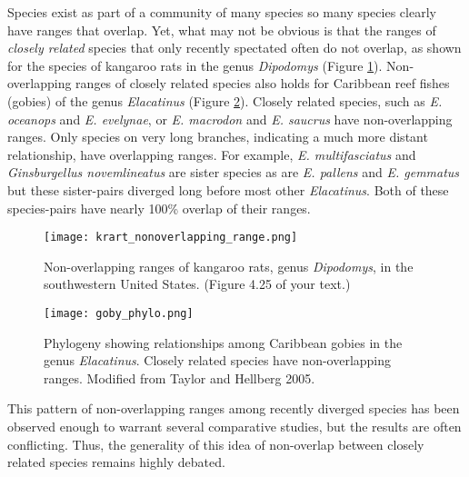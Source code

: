 \documentclass[11pt, hidelinks]{article}
\begin{document}
Species exist as part of a community of many species so many species clearly have ranges that overlap. Yet, what may not be obvious is that the ranges of \emph{closely related} species that only recently spectated often do not overlap, as shown for the species of kangaroo rats in the genus \emph{Dipodomys} (Figure \ref{krat range}).  Non-overlapping ranges of closely related species also holds for Caribbean reef fishes (gobies) of the genus \emph{Elacatinus} (Figure \ref{elacatinus}). Closely related species, such as \emph{E. oceanops} and \emph{E. evelynae}, or \emph{E. macrodon} and \emph{E. saucrus} have non-overlapping ranges.  Only species on very long branches, indicating a much more distant relationship, have overlapping ranges.  For example, \emph{E. multifasciatus} and \emph{Ginsburgellus novemlineatus} are sister species as are \emph{E. pallens} and \emph{E. gemmatus} but these sister-pairs diverged long before most other \emph{Elacatinus}. Both of these species-pairs have nearly 100\% overlap of their ranges.

\begin{figure}[tb]
	\centering
		\texttt{[image: krart\_nonoverlapping\_range.png]}  
		\caption{Non-overlapping ranges of kangaroo rats, genus \emph{Dipodomys}, in the southwestern United States. (Figure 4.25 of your text.)\label{krat range}}
\end{figure}

\begin{figure}[tb]
	\centering
		\texttt{[image: goby\_phylo.png]}  
		\caption{Phylogeny showing relationships among Caribbean gobies in the genus \emph{Elacatinus}. Closely related species have non-overlapping ranges. Modified from Taylor and Hellberg 2005.\label{elacatinus}}
\end{figure}

This pattern of non-overlapping ranges among recently diverged species has been observed enough to warrant several comparative studies, but the results are often conflicting.  Thus, the generality of this idea of non-overlap between closely related species remains highly debated.
\end{document}
